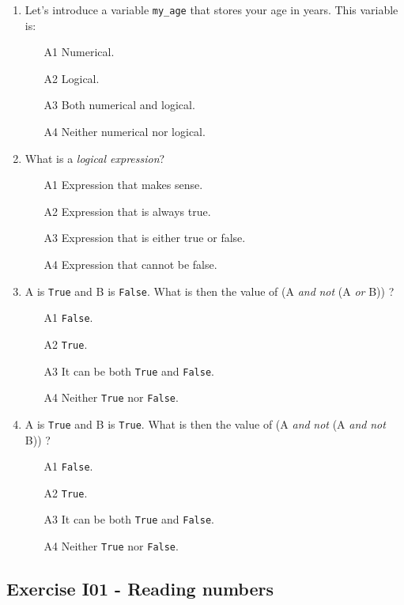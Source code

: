 {{{{\begin{enumerate}
\item Let's introduce a variable {\tt my\_age} that stores your age in years.
      This variable is:
\begin{enumerate}
\item[A1] Numerical.
\item[A2] Logical.
\item[A3] Both numerical and logical.
\item[A4] Neither numerical nor logical.
\end{enumerate}
\item What is a {\em logical expression}? 
\begin{enumerate}
\item[A1] Expression that makes sense.
\item[A2] Expression that is always true. 
\item[A3] Expression that is either true or false.
\item[A4] Expression that cannot be false.
\end{enumerate}
\item A is {\tt True} and B is {\tt False}. What is then the value of (A {\em and} {\em not} (A {\em or} B)) ?
\begin{enumerate}
\item[A1] {\tt False}.
\item[A2] {\tt True}.
\item[A3] It can be both {\tt True} and {\tt False}.
\item[A4] Neither {\tt True} nor {\tt False}.
\end{enumerate}
\item A is {\tt True} and B is {\tt True}. What is then the value of (A {\em and} {\em not} (A {\em and} {\em not} B)) ?
\begin{enumerate}
\item[A1] {\tt False}.
\item[A2] {\tt True}.
\item[A3] It can be both {\tt True} and {\tt False}.
\item[A4] Neither {\tt True} nor {\tt False}.
\end{enumerate}
\end{enumerate}

\subsection{Exercise I01 - Reading numbers}

}}}}

